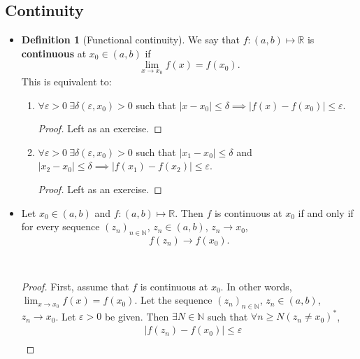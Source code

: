 \documentclass{article}
\newcommand{\R}{\mathbb{R}}
\newcommand{\N}{\mathbb{N}}
\newcommand{\seq}[2]{(#1_{#2})_{#2 \in \N}}
\newcommand{\?}{\stackrel{?}{=}}
\theoremstyle{definition} %
\newtheorem{definition}[theorem]{Definition} %
\begin{document}
\subsection{Continuity}

\begin{itemize}
    \item[]
          \begin{definition}[Functional continuity]
              We say that $f: (a, b) \mapsto \R$ is \textbf{continuous} at $x_0 \in (a, b)$ if
              $$\lim_{x \to x_0} f(x) = f(x_0).$$
              This is equivalent to:
              \begin{enumerate}[label=(\roman*)]
                  \item $\forall \varepsilon > 0 \ \exists \delta(\varepsilon, x_0) > 0$ such that $|x - x_0| \leq \delta \implies |f(x) - f(x_0)| \leq \varepsilon$.
                        \begin{proof}
                            Left as an exercise.
                        \end{proof}
                  \item $\forall \varepsilon > 0 \ \exists \delta(\varepsilon, x_0) > 0$ such that $|x_1 - x_0| \leq \delta$ and $|x_2 - x_0| \leq \delta \implies |f(x_1) - f(x_2)| \leq \varepsilon$.
                        \begin{proof}
                            Left as an exercise.
                        \end{proof}
              \end{enumerate}
          \end{definition}
    \item[]
          \begin{lemma}
              Let $x_0 \in (a, b)$ and $f: (a, b) \mapsto \R$. Then $f$ is continuous at $x_0$ if and only if for every sequence $\seq{z}{n}$, $z_n \in (a, b)$, $z_n \rightarrow x_0$,
              $$f(z_n) \rightarrow f(x_0).$$
          \end{lemma}\
          \begin{proof}
              First, assume that $f$ is continuous at $x_0$. In other words, $\lim_{x \to x_0} f(x) = f(x_0)$. Let the sequence $\seq{z}{n}$, $z_n \in (a, b)$, $z_n \rightarrow x_0$. Let $\varepsilon > 0$ be given. Then $\exists N \in \N$ such that $\forall n \geq N (z_n \neq x_0)^*$,
              \begin{align*}
                           & |f(z_n) - f(x_0)| \leq \varepsilon \\

\end{align*}
\end{proof}
\end{itemize}
\end{document}
